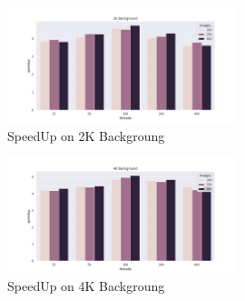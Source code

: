 \documentclass[10pt,twocolumn,letterpaper,english]{article}
\begin{document}
\begin{figure}[H]
	\caption{SpeedUp on 2K Backgroung}
	\centering
	\label{fig:2K}
	\includegraphics[width=0.6\textwidth]{../plots/2k.png}
\end{figure}

\begin{figure}[H]
	\caption{SpeedUp on 4K Backgroung}
	\centering
	\label{fig:4K}
	\includegraphics[width=0.6\textwidth]{../plots/4k.png}
\end{figure}



{\small


}
\end{document}
